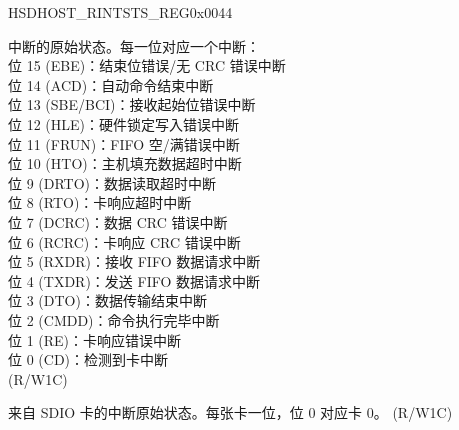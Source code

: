 \begin{register}{H}{SDHOST\_RINTSTS\_REG}{0x0044}\label{regdesc:SDHOSTRINTSTSREG}
%
%
%
\regnewline%
\begin{regdesc}\begin{reglist}
\label{fielddesc:SDHOSTINTSTATUSRAW}\item [SDHOST\_INT\_STATUS\_RAW] 中断的原始状态。每一位对应一个中断：\\
位 15 (EBE)：结束位错误/无 CRC 错误中断\\
位 14 (ACD)：自动命令结束中断\\
位 13 (SBE/BCI)：接收起始位错误中断\\
位 12 (HLE)：硬件锁定写入错误中断\\
位 11 (FRUN)：FIFO 空/满错误中断\\
位 10 (HTO)：主机填充数据超时中断\\
位 9 (DRTO)：数据读取超时中断\\
位 8 (RTO)：卡响应超时中断\\
位 7 (DCRC)：数据 CRC 错误中断\\
位 6 (RCRC)：卡响应 CRC 错误中断\\
位 5 (RXDR)：接收 FIFO 数据请求中断\\
位 4 (TXDR)：发送 FIFO 数据请求中断\\
位 3 (DTO)：数据传输结束中断\\
位 2 (CMDD)：命令执行完毕中断\\
位 1 (RE)：卡响应错误中断\\
位 0 (CD)：检测到卡中断\\ (R/W1C)
\label{fielddesc:SDHOSTSDIOINTERRUPTRAW}\item [SDHOST\_SDIO\_INTERRUPT\_RAW] 来自 SDIO 卡的中断原始状态。每张卡一位，位 0 对应卡 0。 (R/W1C)
\end{reglist}\end{regdesc}
\end{register}

